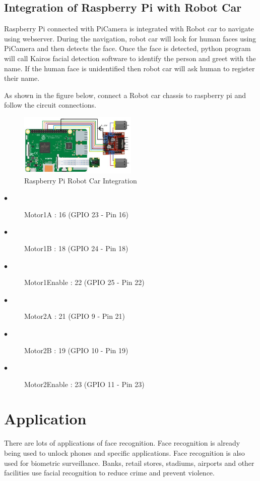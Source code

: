\documentclass[sigconf]{acmart}
\begin{document}
\subsection{Integration of Raspberry Pi with Robot Car}
Raspberry Pi connected with PiCamera is integrated with Robot car to navigate using webserver. During the navigation, robot car will look for human faces using PiCamera and then detects the face. Once the face is detected, python program will call Kairos facial detection software to identify the person and greet with the name. If the human face is unidentified then robot car will ask human to register their name.

As shown in the figure below, connect a Robot car chassis to raspberry pi and follow the circuit connections.

\begin{figure}[ht!]
  \includegraphics[width=0.5\textwidth]{project/images/RaspPi_Robot.jpg}
  \caption{Raspberry Pi Robot Car Integration}
\end{figure}

\begin{description}
    \item[$\bullet$] Motor1A : 16 (GPIO 23 - Pin 16)
    \item[$\bullet$] Motor1B : 18 (GPIO 24 - Pin 18)
    \item[$\bullet$] Motor1Enable : 22 (GPIO 25 - Pin 22)
    \item[$\bullet$] Motor2A : 21 (GPIO 9 - Pin 21)
    \item[$\bullet$] Motor2B : 19 (GPIO 10 - Pin 19)
    \item[$\bullet$] Motor2Enable : 23 (GPIO 11 - Pin 23)
\end{description}


\section{Application}
There are lots of applications of face recognition. Face recognition is already being used to unlock phones and specific applications. Face recognition is also used for biometric surveillance. Banks, retail stores, stadiums, airports and other facilities use facial recognition to reduce crime and prevent violence.
\end{document}
